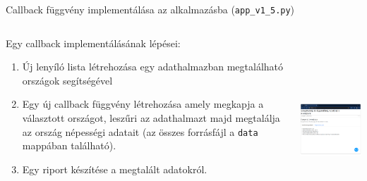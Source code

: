 \documentclass[english, aspectratio=169]{beamer}
\begin{document}
\begin{frame}[fragile]{Callback függvény implementálása az alkalmazásba (\texttt{app\_v1\_5.py})}
	\begin{columns}
		\begin{column}{.5\textwidth}
			Egy callback implementálásának lépései:
			\begin{enumerate}
				\item Új lenyíló lista létrehozása egy adathalmazban megtalálható országok segítségével
				\item Egy új callback függvény létrehozása amely megkapja a választott országot, leszűri az adathalmazt majd megtalálja az ország népességi adatait (az összes forrásfájl a \texttt{data} mappában található). 
				\item Egy riport készítése a megtalált adatokról. 
			\end{enumerate}
		\end{column}
		\begin{column}{.5\textwidth}
			\begin{center}
				\includegraphics[width=7cm, height=7cm, keepaspectratio]{images/dash_14.png}
			\end{center}
		\end{column}
	\end{columns}
\end{frame}
\end{document}
